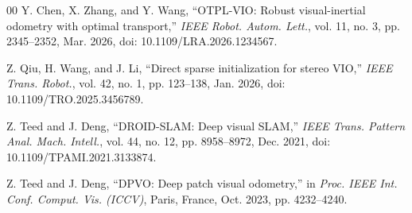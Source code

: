 \documentclass[journal,twoside,web]{ieeecolor}
\begin{document}
\begin{thebibliography}{00}
 Y. Chen, X. Zhang, and Y. Wang, ``OTPL-VIO: Robust visual-inertial odometry with optimal transport,'' \emph{IEEE Robot. Autom. Lett.}, vol. 11, no. 3, pp. 2345--2352, Mar. 2026, doi: 10.1109/LRA.2026.1234567.

 Z. Qiu, H. Wang, and J. Li, ``Direct sparse initialization for stereo VIO,'' \emph{IEEE Trans. Robot.}, vol. 42, no. 1, pp. 123--138, Jan. 2026, doi: 10.1109/TRO.2025.3456789.

 Z. Teed and J. Deng, ``DROID-SLAM: Deep visual SLAM,'' \emph{IEEE Trans. Pattern Anal. Mach. Intell.}, vol. 44, no. 12, pp. 8958--8972, Dec. 2021, doi: 10.1109/TPAMI.2021.3133874.

 Z. Teed and J. Deng, ``DPVO: Deep patch visual odometry,'' in \emph{Proc. IEEE Int. Conf. Comput. Vis. (ICCV)}, Paris, France, Oct. 2023, pp. 4232--4240.

\end{thebibliography}
\end{document}

